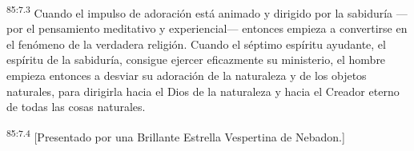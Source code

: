 \par
\textsuperscript{85:7.3} Cuando el impulso de adoración está animado y dirigido por la sabiduría ---por el pensamiento meditativo y experiencial--- entonces empieza a convertirse en el fenómeno de la verdadera religión. Cuando el séptimo espíritu ayudante, el espíritu de la sabiduría, consigue ejercer eficazmente su ministerio, el hombre empieza entonces a desviar su adoración de la naturaleza y de los objetos naturales, para dirigirla hacia el Dios de la naturaleza y hacia el Creador eterno de todas las cosas naturales.

\par
\textsuperscript{85:7.4} [Presentado por una Brillante Estrella Vespertina de Nebadon.]